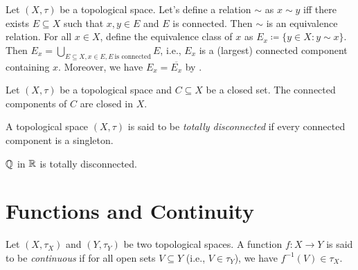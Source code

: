 \documentclass{techreport}
\begin{document}
\begin{definition}\label{De:ConnEquivalenceRelation}
	Let $(X,\tau)$ be a topological space.
	Let's define a relation ${\sim}$ as $x \sim y$ iff there exists $E \subseteq X$ such that $x,y\in E$ and $E$ is connected.
	Then ${\sim}$ is an equivalence relation.
	For all $x \in X$, define the equivalence class of $x$ as $E_x \coloneqq \{ y \in X : y \sim x \}$.
	Then $E_x = \bigcup_{E \subseteq X, x \in E, E~\text{is connected}} E$, i.e., $E_x$ is a (largest) connected component containing $x$.
	Moreover, we have $E_x = \overline{E_x}$ by .
\end{definition}

\begin{proposition}\label{Prop:ClosedConnComponentStillClosed}
	Let $(X,\tau)$ be a topological space and $C \subseteq X$ be a closed set.
	The connected components of $C$ are closed in $X$.
\end{proposition}

\begin{definition}\label{De:TotalDisconnectedness}
	A topological space $(X,\tau)$ is said to be \emph{totally disconnected} if every connected component is a singleton.
\end{definition}

\begin{example}\label{De:QInRIsTotallyDisconn}
	$\mathbb{Q}$ in $\mathbb{R}$ is totally disconnected.
\end{example}

\section{Functions and Continuity}

\begin{definition}\label{De:ContinuousFunctions}
	Let $(X,\tau_X)$ and $(Y,\tau_Y)$ be two topological spaces.
	A function $f : X \to Y$ is said to be \emph{continuous} if for all open sets $V \subseteq Y$ (i.e., $V \in \tau_Y$), we have $f^{-1}(V) \in \tau_X$.
\end{definition}
\end{document}
